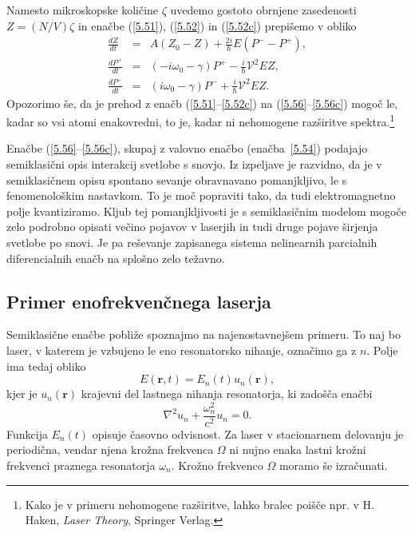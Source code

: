Namesto mikroskopske količine $\zeta$ uvedemo gostoto obrnjene
zasedenosti $Z=(N/V)\zeta$ in enačbe (\ref{5.51}), (\ref{5.52}) in (\ref{5.52c})
prepišemo v obliko 
\begin{eqnarray}
\frac{dZ}{dt} &=& A\left(Z_0-Z\right)+\frac{2i}{\hbar}E\left(P^- - P^+\right), \label{5.56} \\
\frac{dP^+}{dt}&=&\left(-i \omega_0-\gamma\right)P^{+}-\frac{i}{\hbar} \mathcal{V}^2 E  Z, \label{5.56b}\\
\frac{dP^-}{dt}&=&\left(i \omega_0-\gamma\right)P^{-}+\frac{i}{\hbar} \mathcal{V}^2 E  Z.\label{5.56c} 
\end{eqnarray}
Opozorimo še, da je prehod z enačb (\ref{5.51}--\ref{5.52c}) na (\ref{5.56}--\ref{5.56c}) 
mogoč le, kadar so vsi atomi enakovredni, to je, kadar ni nehomogene razširitve 
spektra.\footnote{Kako je v primeru nehomogene razširitve, lahko bralec poišče npr. v 
H. Haken, {\it Laser Theory}, Springer Verlag.}

Enačbe (\ref{5.56}--\ref{5.56c}), skupaj z valovno enačbo (enačba~\ref{5.54}) podajajo
semiklasični opis interakcij svetlobe s snovjo. Iz izpeljave je razvidno, da
je v semiklasičnem opisu spontano sevanje obravnavano pomanjkljivo, le s fenomenološkim
nastavkom. To je moč popraviti tako, da tudi elektromagnetno polje kvantiziramo. 
Kljub tej pomanjkljivosti je s semiklasičnim modelom mogoče zelo podrobno opisati 
večino pojavov v laserjih in tudi druge pojave širjenja svetlobe po snovi. Je pa 
reševanje zapisanega sistema nelinearnih parcialnih diferencialnih enačb  
na splošno zelo težavno.

\subsection*{Primer enofrekvenčnega laserja}
Semiklasične enačbe pobliže spoznajmo na najenostavnejšem primeru. To naj bo laser, 
v katerem je vzbujeno le eno resonatorsko nihanje, označimo ga z $n$.
Polje ima tedaj obliko
\begin{equation}  
\label{5.57}
E(\mathbf{r},t)= E_n(t)u_n(\mathbf{r}),
\end{equation}
kjer je $u_n(\mathbf{r})$ krajevni del lastnega nihanja resonatorja, ki
zadošča enačbi 
\begin{equation}  
\label{5.58}
\nabla^2 u_n+\frac{\omega_n^2}{c^2}u_n=0.
\end{equation}
Funkcija $E_n(t)$ opisuje časovno odvisnost. Za laser v stacionarnem
delovanju je periodična, vendar njena krožna frekvenca $\Omega$ ni nujno enaka lastni
krožni frekvenci praznega resonatorja $\omega_n$. Krožno frekvenco 
$\Omega$ moramo še izračunati.

